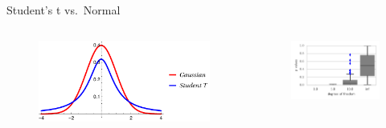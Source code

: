 \documentclass{beamer}
\begin{document}
  \begin{frame}{Student's t vs.~Normal}
\begin{columns}
        \begin{column}{.5\textwidth}
        \begin{figure}
           \includegraphics[width=\textwidth]{img/nt}   
        \end{figure}
        \end{column}
        \begin{column}{.5\textwidth}
            \begin{figure}
           \includegraphics[width=\textwidth]{img/sgld_student_opt} 
        \end{figure}
        \end{column}
    \end{columns}

\end{frame}
\end{document}
